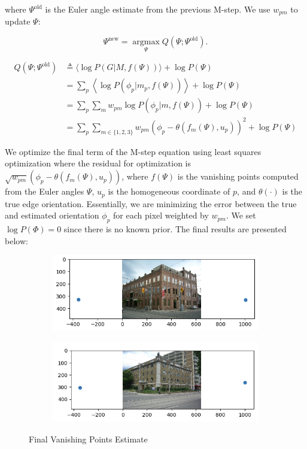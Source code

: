 \documentclass[a4paper]{article}
\begin{document}
	where $\Psi^\text{old}$ is the Euler angle estimate from the previous M-step. We use $w_{pm}$ to update $\Psi$:
	
	\begin{equation}
		\Psi^\text{new}=\underset{\Psi}{\operatorname{argmax}} Q\left(\Psi ; \Psi^\text{old}\right).
	\end{equation}
	
	\begin{equation}
	\begin{aligned}
	Q\left(\Psi ; \Psi^\text{old}\right) &\triangleq \langle\log P(G | M, f(\Psi))\rangle+\log P(\Psi) \\
	&= \sum_{p}\left\langle\log P\left(\phi_{p} | m_{p}, f(\Psi)\right)\right\rangle+\log P(\Psi) \\
	&= \sum_{p} \sum_{m} w_{p m} \log P\left(\phi_{p} | m, f(\Psi)\right)+\log P(\Psi) \\
	&= \sum_{p} \sum_{m \in\{1, 2, 3\}} w_{p m}\left(\phi_{p}-\theta\left(f_{m}(\Psi), u_{p}\right)\right)^{2}+\log P(\Psi)
	\end{aligned}
	\end{equation}
	
	We optimize the final term of the M-step equation using least squares optimization where the residual for optimization is \(\sqrt{w_{pm}} \left(\phi_p - \theta(f_m(\Psi), u_p)\right)\), where $f(\Psi)$ is the vanishing points computed from the Euler angles $\Psi$, $u_p$ is the homogeneous coordinate of $p$, and $\theta(\cdot)$ is the true edge orientation. Essentially, we are minimizing the error between the true and estimated orientation $\phi_p$ for each pixel weighted by $w_{pm}$. We set $\log{P(\Phi)} = 0$ since there is no known prior. The final results are presented below: 
	\begin{figure}[ht]
		\centering
		\begin{subfigure}
			\centering
			\includegraphics[width=0.9\columnwidth]{images/vp_final1}
		\end{subfigure}
		\begin{subfigure}
			\centering
			\includegraphics[width=0.9\columnwidth]{images/vp_final2}
		\end{subfigure}
		\caption{Final Vanishing Points Estimate}
	\end{figure}
	
\end{document}
